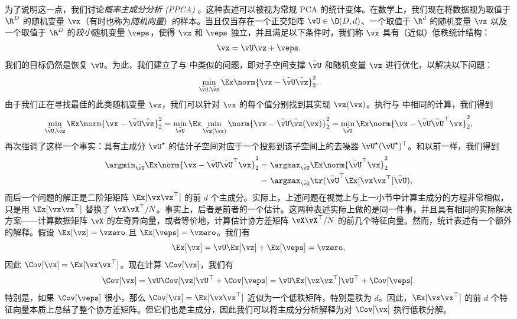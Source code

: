 \documentclass[../../book-main_zh.tex]{subfiles}
\begin{document}
为了说明这一点，我们讨论\textit{概率主成分分析 (PPCA)} \citep{TippingM1999}。这种表述可以被视为常规
PCA 的统计变体。在数学上，我们现在将数据视为取值于 \(\R^{D}\) 的随机变量
\(\vx\)（有时也称为\textit{随机向量}）的样本。当且仅当存在一个正交矩阵 \(\vU \in \O(D,
d)\)、一个取值于 \(\R^{d}\) 的随机变量 \(\vz\) 以及一个取值于 \(\R^{D}\)
的\textit{较小}随机变量 \(\veps\)，使得 \(\vz\) 和 \(\veps\) 独立，并且满足以下条件时，我们称
\(\vx\) 具有（近似）低秩统计结构：
\begin{equation}
    \vx = \vU\vz + \veps.
\end{equation}
我们的目标仍然是恢复 \(\vU\)。为此，我们建立了与  中类似的问题，即对子空间支撑
\(\tilde{\vU}\) 和随机变量 \(\vz\) 进行优化，以解决以下问题：
\begin{equation}
    \min_{\tilde{\vU}, \tilde{\vz}}\Ex\norm{\vx -
    \tilde{\vU}\tilde{\vz}}_{2}^{2}.
\end{equation}
由于我们正在寻找最佳的此类随机变量 \(\vz\)，我们可以针对 \(\vx\) 的每个值分别找到其实现 \(\vz(\vx)\)。执行与
 中相同的计算，我们得到 %
\begin{equation}\label{eq:ppca_denoising}
    \min_{\tilde{\vU}, \tilde{\vz}}\Ex\norm{\vx -
    \tilde{\vU}\tilde{\vz}}_{2}^{2} =
    \min_{\tilde{\vU}}\Ex\min_{\tilde{\vz}(\vx)}\norm{\vx -
    \tilde{\vU}\tilde{\vz}(\vx)}_{2}^{2} =
    \min_{\tilde{\vU}}\Ex\norm{\vx - \tilde{\vU}\tilde{\vU}^{\top}\vx}_{2}^{2},
\end{equation}
再次强调了这样一个事实：具有主成分 \(\vU^{\star}\) 的估计子空间对应于一个投影到该子空间上的去噪器
\(\vU^{\star}(\vU^{\star})^{\top}\)。和以前一样，我们得到
\begin{align}\label{eq:PPCA}
    \argmin_{\tilde{\vU}}\Ex\norm{\vx -
    \tilde{\vU}\tilde{\vU}^{\top}\vx}_{2}^{2}
    &= \argmax_{\tilde{\vU}}\Ex\norm{\tilde{\vU}^{\top}\vx}_{2}^{2} \\
    &=
    \argmax_{\tilde{\vU}}\tr(\tilde{\vU}^{\top}\Ex[\vx\vx^{\top}]\tilde{\vU}),
\end{align}
而后一个问题的解正是二阶矩矩阵 \(\Ex[\vx\vx^{\top}]\) 的前 \(d\)
个主成分。实际上，上述问题在视觉上与上一小节中计算主成分的方程非常相似，只是用 \(\Ex[\vx\vx^{\top}]\) 替换了
\(\vX\vX^{\top}/N\)。事实上，后者是前者的一个估计。这两种表述实际上做的是同一件事，并且具有相同的实际解决方案——计算数据矩阵
\(\vX\) 的左奇异向量，或者等价地，计算估计协方差矩阵 \(\vX\vX^{\top}/N\)
的前几个特征向量。然而，统计表述有一个额外的解释。假设 \(\Ex[\vz] = \vzero\) 且 \(\Ex[\veps] =
\vzero\)。我们有
\begin{equation}
    \Ex[\vx] = \vU\Ex[\vz] + \Ex[\veps] = \vzero,
\end{equation}
因此 \(\Cov[\vx] = \Ex[\vx\vx^{\top}]\)。现在计算 \(\Cov[\vx]\)，我们有
\begin{equation}
    \Cov[\vx] = \vU\Cov[\vz]\vU^{\top} + \Cov[\veps] =
    \vU\Ex[\vz\vz^{\top}]\vU^{\top} + \Cov[\veps].
\end{equation}
特别是，如果 \(\Cov[\veps]\) 很小，那么 \(\Cov[\vx]
= \Ex[\vx\vx^{\top}]\) 近似为一个低秩矩阵，特别是秩为
\(d\)。因此，\(\Ex[\vx\vx^{\top}]\) 的前 \(d\)
个特征向量本质上总结了整个协方差矩阵。但它们也是主成分，因此我们可以将主成分分析解释为对 \(\Cov[\vx]\) 执行低秩分解。
\end{document}
